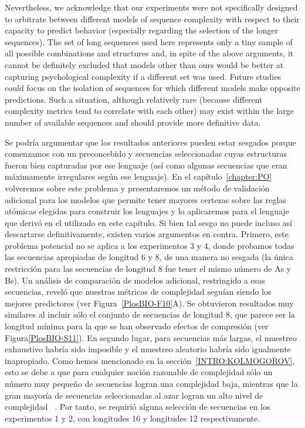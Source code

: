 Nevertheless, we acknowledge that our experiments were not specifically designed to arbitrate between different models of sequence complexity with respect to their capacity to predict behavior (especially regarding the selection of the longer sequences). The set of long sequences used here represents only a tiny sample of all possible combinations and structures and, in spite of the above arguments, it cannot be definitely excluded that models other than ours would be better at capturing psychological complexity if a different set was used. Future studies could focus on the isolation of sequences for which different models make opposite predictions. Such a situation, although relatively rare (because different complexity metrics tend to correlate with each other) may exist within the large number of available sequences and should provide more definitive data.

Se podría argumentar que los resultados anteriores pueden estar sesgados porque comenzamos con un \lot preconcebido y secuencias seleccionadas cuyas estructuras fueron bien capturadas por ese lenguaje (así como algunas secuencias que eran máximamente irregulares según ese lenguaje). En el capítulo~\ref{chapter:PO} volveremos sobre este problema y presentaremos un método de validación adicional para los modelos \lot que permite tener mayores certezas sobre las reglas atómicas elegidas para construir los lenguajes y lo aplicaremos para el lenguaje \gramgeo que derivó en el utilizado en este capítulo. Si bien tal sesgo no puede incluso así descartarse definitivamente, existen varios argumentos en contra. Primero, este problema potencial no se aplica a los experimentos 3 y 4, donde probamos todas las secuencias apropiadas de longitud 6 y 8, de una manera no sesgada (la única restricción para las secuencias de longitud 8 fue tener el mismo número de As y Bs). Un análisis de comparación de modelos adicional, restringido a esas secuencias, reveló que nuestras métricas de complejidad seguían siendo los mejores predictores (ver Figura~\ref{PlosBIO-F10}A). Se obtuvieron resultados muy similares al incluir sólo el conjunto de secuencias de longitud 8, que parece ser la longitud mínima para la que se han observado efectos de compresión (ver Figura\ref{PlosBIO-S11}). En segundo lugar, para secuencias más largas, el muestreo exhaustivo habría sido imposible y el muestreo aleatorio habría sido igualmente inapropiado. Como hemos mencionado en la sección~\ref{INTRO:KOLMOGOROV}, esto se debe a que para cualquier noción razonable de complejidad sólo un número muy pequeño de secuencias logran una complejidad baja, mientras que la gran mayoría de secuencias seleccionadas al azar logran un alto nivel de complejidad ~\cite{chaitin1975theory,C87b}. Por tanto, se requirió alguna selección de secuencias en los experimentos 1 y 2, con longitudes 16 y longitudes 12 respectivamente. 

